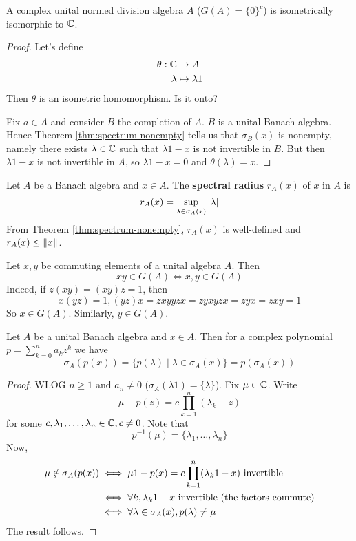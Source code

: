 \documentclass{article}
\begin{document}
\begin{cor}
  A complex unital normed division algebra $A$ ($G(A) = \{0\}^c$) is isometrically isomorphic to $\mathbb C$.
\end{cor}
\begin{proof}
  Let's define
  \begin{align*}
    \theta : \mathbb C & \to A \\
    \lambda & \mapsto \lambda 1
  \end{align*}
  Then $\theta$ is an isometric homomorphism. Is it onto?

  Fix $a \in A$ and consider $B$ the completion of $A$. $B$ is a unital Banach algebra. Hence Theorem \ref{thm:spectrum-nonempty} tells us that $\sigma_B(x)$ is nonempty, namely there exists $\lambda \in \mathbb C$ such that $\lambda 1 - x$ is not invertible in $B$. But then $\lambda 1 - x$ is not invertible in $A$, so $\lambda 1 - x = 0$ and $\theta(\lambda) = x$.
\end{proof}

\begin{dfn*}
  Let $A$ be a Banach algebra and $x \in A$. The {\bf spectral radius} $r_A(x)$ of $x$ in $A$ is
  $$r_A(x) = \sup_{\lambda \in \sigma_A(x)} \left\lvert \lambda\right\rvert$$
  From Theorem \ref{thm:spectrum-nonempty}, $r_A(x)$ is well-defined and $r_A(x) \le \left\lVert x\right\rVert$.
\end{dfn*}

\begin{note}
  Let $x, y$ be commuting elements of a unital algebra $A$. Then
  $$xy \in G(A) \iff x, y \in G(A)$$
  Indeed, if $z(xy) = (xy)z = 1$, then
  $$x(yz) = 1, (yz)x = zxyyzx = zyxyzx = zyx = zxy = 1$$
  So $x \in G(A)$. Similarly, $y \in G(A)$.
\end{note}

\begin{lem}\label{lem:poly-smt}
  Let $A$ be a unital Banach algebra and $x \in A$. Then for a complex polynomial $p = \sum_{k = 0}^n a_k z^k$ we have
  $$\sigma_A(p(x)) = \{p(\lambda) \mid \lambda \in \sigma_A(x)\} = p(\sigma_A(x))$$
\end{lem}
\begin{proof}
  WLOG $n \ge 1$ and $a_n \ne 0$ ($\sigma_A(\lambda 1) = \{\lambda\}$). Fix $\mu \in \mathbb C$. Write
  $$\mu - p(z) = c\prod_{k = 1}^n (\lambda_k - z)$$
  for some $c, \lambda_1, \dots, \lambda_n \in \mathbb C, c \ne 0$. Note that
  $$p^{-1}(\mu) = \{\lambda_1, \dots, \lambda_n\}$$
  Now,
  \begin{align*}
    \mu \notin \sigma_A(p(x))
    & \iff \mu 1 - p(x) = c \prod_{k = 1}^n (\lambda_k 1 - x) \text{ invertible} \\
    & \iff \forall k, \lambda_k 1 - x \text{ invertible (the factors commute)} \\
    & \iff \forall \lambda \in \sigma_A(x), p(\lambda) \ne \mu
  \end{align*}
  The result follows.
\end{proof}
\end{document}
